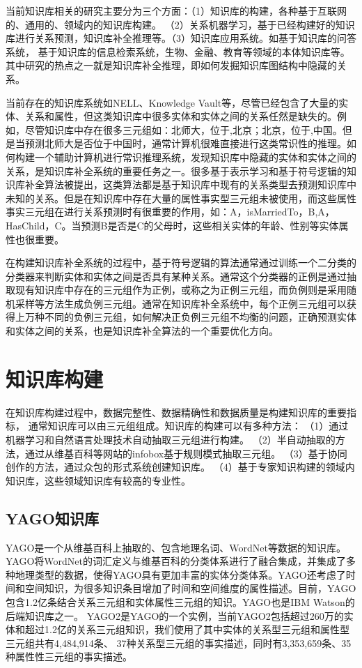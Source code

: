 当前知识库相关的研究主要分为三个方面：（1）知识库的构建，各种基于互联网的、通用的、领域内的知识库构建。
（2）关系机器学习，基于已经构建好的知识库进行关系预测，知识库补全推理等。（3）知识库应用系统。如基于知识库的问答系统，
基于知识库的信息检索系统，生物、金融、教育等领域的本体知识库等。其中研究的热点之一就是知识库补全推理，即如何发掘知识库图结构中隐藏的关系。

当前存在的知识库系统如NELL、Knowledge Vault等，尽管已经包含了大量的实体、关系和属性，但这类知识库中很多实体和实体之间的关系任然是缺失的。例如，尽管知识库中存在很多三元组如：北师大，位于,北京；北京，位于,中国。但是当预测北师大是否位于中国时，通常计算机很难直接进行这类常识性的推理。如何构建一个辅助计算机进行常识推理系统，发现知识库中隐藏的实体和实体之间的关系，是知识库补全系统的重要任务之一。很多基于表示学习和基于符号逻辑的知识库补全算法被提出，这类算法都是基于知识库中现有的关系类型去预测知识库中未知的关系。但是在知识库中存在大量的属性事实型三元组未被使用，而这些属性事实三元组在进行关系预测时有很重要的作用，如：A，isMarriedTo，B,A，HasChild，C。当预测B是否是C的父母时，这些相关实体的年龄、性别等实体属性也很重要。

在构建知识库补全系统的过程中，基于符号逻辑的算法通常通过训练一个二分类的分类器来判断实体和实体之间是否具有某种关系。通常这个分类器的正例是通过抽取现有知识库中存在的三元组作为正例，或称之为正例三元组，而负例则是采用随机采样等方法生成负例三元组。通常在知识库补全系统中，每个正例三元组可以获得上万种不同的负例三元组，如何解决正负例三元组不均衡的问题，正确预测实体和实体之间的关系，也是知识库补全算法的一个重要优化方向。

\section{知识库构建}
在知识库构建过程中，数据完整性、数据精确性和数据质量是构建知识库的重要指标，
通常知识库可以由三元组组成。知识库的构建可以有多种方法：
（1）通过机器学习和自然语言处理技术自动抽取三元组\cite{Weikum2010FromIT}进行构建。
（2）半自动抽取的方法，通过从维基百科等网站的infobox基于规则模式抽取三元组。
（3）基于协同创作\cite{Vrandecic2014WikidataAF}的方法，通过众包的形式系统创建知识库。
（4）基于专家知识构建的领域内知识库，这些领域知识库有较高的专业性。

\subsection{YAGO知识库}
YAGO是一个从维基百科上抽取的、包含地理名词、WordNet\cite{Kasneci2008TheYA}等数据的知识库。
YAGO将WordNet的词汇定义与维基百科的分类体系进行了融合集成\cite{Suchanek2008YAGOAL}，并集成了多种地理类型的数据，使得YAGO具有更加丰富的实体分类体系。YAGO还考虑了时间和空间知识\cite{Hoffart2011YAGO2EA}，为很多知识条目增加了时间和空间维度的属性描述。目前，YAGO包含1.2亿条结合关系三元组和实体属性三元组的知识。YAGO也是IBM Watson\cite{Ferrucci2010BuildingWA}的后端知识库之一。
YAGO2\cite{Hoffart2013YAGO2AS}是YAGO的一个实例，当前YAGO2包括超过260万的实体和超过1.2亿的关系三元组知识，我们使用了其中实体的关系型三元组和属性型三元组共有4,484,914条、
37种关系型三元组的事实描述，同时有3,353,659条、35种属性性三元组的事实描述。

